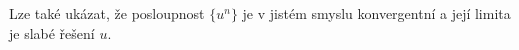 Lze také ukázat, že posloupnost $\{u^n\}$ je v jistém smyslu konvergentní a její limita je slabé řešení $u$.




% 
% 





